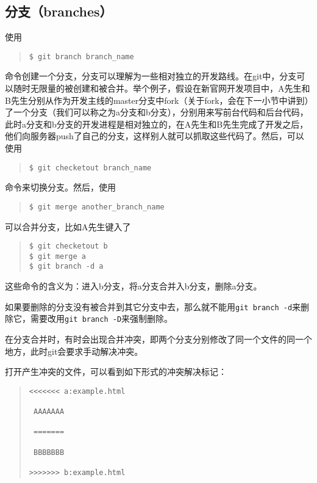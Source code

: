 \documentclass{article}
\begin{document}
		\subsection{分支（branches）} %
		\label{sub:分支}
			使用
			\begin{quote}
				\begin{lstlisting}
$ git branch branch_name
				\end{lstlisting}
			\end{quote}
			命令创建一个分支，分支可以理解为一些相对独立的开发路线。在git中，分支可以随时无限量的被创建和被合并。举个例子，假设在新官网开发项目中，A先生和B先生分别从作为开发主线的master分支中fork（关于fork，会在下一小节中讲到）了一个分支（我们可以称之为a分支和b分支），分别用来写前台代码和后台代码，此时a分支和b分支的开发进程是相对独立的，在A先生和B先生完成了开发之后，他们向服务器push了自己的分支，这样别人就可以抓取这些代码了。然后，可以使用
			\begin{quote}
				\begin{lstlisting}
$ git checketout branch_name
				\end{lstlisting}
			\end{quote}
			命令来切换分支。然后，使用
			\begin{quote}
				\begin{lstlisting}
$ git merge another_branch_name
				\end{lstlisting}
			\end{quote}
			可以合并分支，比如A先生键入了
			\begin{quote}
				\begin{lstlisting}
$ git checketout b 
$ git merge a
$ git branch -d a
				\end{lstlisting}
			\end{quote}
			这些命令的含义为：进入b分支，将a分支合并入b分支，删除a分支。
			\par 如果要删除的分支没有被合并到其它分支中去，那么就不能用{\tt git branch -d}来删除它，需要改用{\tt git branch -D}来强制删除。
			\par 在分支合并时，有时会出现合并冲突，即两个分支分别修改了同一个文件的同一个地方，此时git会要求手动解决冲突。
			\par 打开产生冲突的文件，可以看到如下形式的冲突解决标记：
			\begin{quote}
				\begin{lstlisting}
<<<<<<< a:example.html

 AAAAAAA

 ======= 

 BBBBBBB

>>>>>>> b:example.html
				\end{lstlisting}
			\end{quote}
\end{document}
